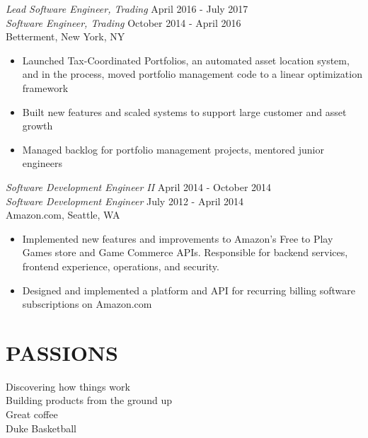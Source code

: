 \documentclass[line,margin]{res}
\begin{document}
\begin{resume}
    {\sl Lead Software Engineer, Trading} \hfill April 2016 - July 2017 \\
    {\sl Software Engineer, Trading} \hfill October 2014 - April 2016 \\
        Betterment, New York, NY
        \begin{itemize}  \itemsep -2pt %
            \item Launched Tax-Coordinated Portfolios, an automated asset location system, and in the process, moved portfolio management code to a linear optimization framework
            \item Built new features and scaled systems to support large customer and asset growth
            \item Managed backlog for portfolio management projects, mentored junior engineers
        \end{itemize}

    {\sl Software Development Engineer II} \hfill April 2014 - October 2014 \\
    {\sl Software Development Engineer} \hfill July 2012 - April 2014 \\
        Amazon.com, Seattle, WA
        \begin{itemize}  \itemsep -2pt %
            \item Implemented new features and improvements to Amazon's Free to Play Games store and Game Commerce APIs. Responsible for backend services, frontend experience, operations, and security.
            \item Designed and implemented a platform and API for recurring billing software subscriptions on Amazon.com
        \end{itemize}

\section{PASSIONS}
    Discovering how things work \\
    Building products from the ground up \\
    Great coffee \\
    Duke Basketball
                
\end{resume}
\end{document}
